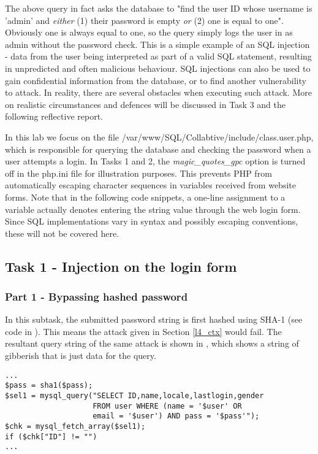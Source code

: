 The above query in fact asks the database to "find the user ID whose username is 'admin' and \emph{either} (1) their password is empty \emph{or} (2) one is equal to one". Obviously one is always equal to one, so the query simply logs the user in as admin without the password check. This is a simple example of an SQL injection - data from the user being interpreted as part of a valid SQL statement, resulting in unpredicted and often malicious behaviour. SQL injections can also be used to gain confidential information from the database, or to find another vulnerability to attack. In reality, there are several obstacles when executing such attack. More on realistic circumstances and defences will be discussed in Task 3 and the following reflective report.

In this lab we focus on the file /var/www/SQL/Collabtive/include/class.user.php, which is responsible for querying the database and checking the password when a user attempts a login. In Tasks 1 and 2, the \emph{magic\_quotes\_gpc} option is turned off in the php.ini file for illustration purposes. This prevents PHP from automatically escaping character sequences in variables received from website forms. Note that in the following code snippets, a one-line assignment to a variable actually denotes entering the string value through the web login form. Since SQL implementations vary in syntax and possibly escaping conventions, these will not be covered here.

\subsection{Task 1 - Injection on the login form} \label{l4_t1}
\subsubsection{Part 1 - Bypassing hashed password} \label{l4_t1p1}
In this subtask, the submitted password string is first hashed using SHA-1 (see code in ). This means the attack given in Section \ref{l4_ctx} would fail. The resultant query string of the same attack is shown in , which shows a string of gibberish that is just data for the query.

\begin{minipage}{\linewidth}
\begin{lstlisting}[caption={Vulnerable SQL login statement},
label={lst:l4_t1p1_vulnstm},
frame=single]
...
$pass = sha1($pass);
$sel1 = mysql_query("SELECT ID,name,locale,lastlogin,gender
                    FROM user WHERE (name = '$user' OR
                    email = '$user') AND pass = '$pass'");
$chk = mysql_fetch_array($sel1);
if ($chk["ID"] != "")
...
\end{lstlisting}
\end{minipage}

